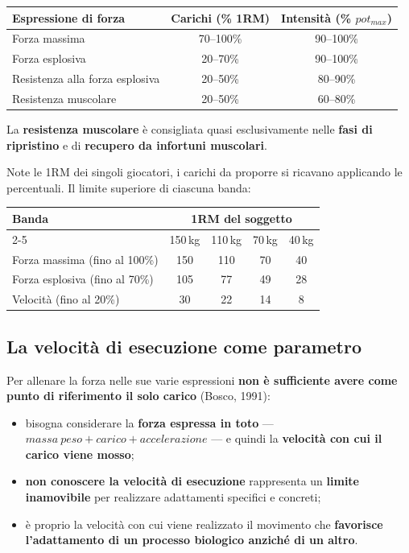 \begin{table}[htbp]
  \centering
  \small
  \renewcommand{\arraystretch}{1.3}
  \begin{tabularx}{\textwidth}{|X|c|c|}
    \hline
    \textbf{Espressione di forza} & \textbf{Carichi (\% 1RM)} & \textbf{Intensità (\% $pot_{max}$)} \\
    \hline
    Forza massima & 70--100\% & 90--100\% \\
    \hline
    Forza esplosiva & 20--70\% & 90--100\% \\
    \hline
    Resistenza alla forza esplosiva & 20--50\% & 80--90\% \\
    \hline
    Resistenza muscolare & 20--50\% & 60--80\% \\
    \hline
  \end{tabularx}
\end{table}

La \textbf{resistenza muscolare} è consigliata quasi esclusivamente nelle \textbf{fasi di ripristino}
e di \textbf{recupero da infortuni muscolari}.

Note le 1RM dei singoli giocatori, i carichi da proporre si ricavano applicando le percentuali. Il
limite superiore di ciascuna banda:

\begin{table}[htbp]
  \centering
  \small
  \renewcommand{\arraystretch}{1.3}
  \begin{tabularx}{\textwidth}{|X|c|c|c|c|}
    \hline
    \textbf{Banda} & \multicolumn{4}{c|}{\textbf{1RM del soggetto}} \\
    \cline{2-5}
     & 150\,kg & 110\,kg & 70\,kg & 40\,kg \\
    \hline
    Forza massima (fino al 100\%) & 150 & 110 & 70 & 40 \\
    \hline
    Forza esplosiva (fino al 70\%) & 105 & 77 & 49 & 28 \\
    \hline
    Velocità (fino al 20\%) & 30 & 22 & 14 & 8 \\
    \hline
  \end{tabularx}
\end{table}

\subsection{La velocità di esecuzione come parametro}

Per allenare la forza nelle sue varie espressioni \textbf{non è sufficiente avere come punto di
riferimento il solo carico} (Bosco, 1991):
\begin{itemize}
  \item bisogna considerare la \textbf{forza espressa in toto} --- $massa\ peso + carico +
    accelerazione$ --- e quindi la \textbf{velocità con cui il carico viene mosso};
  \item \textbf{non conoscere la velocità di esecuzione} rappresenta un \textbf{limite inamovibile}
    per realizzare adattamenti specifici e concreti;
  \item è proprio la velocità con cui viene realizzato il movimento che \textbf{favorisce
    l'adattamento di un processo biologico anziché di un altro}.
\end{itemize}

